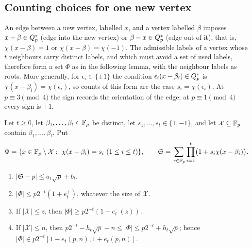 \subsection{Counting choices for one new vertex}\label{subsec:labellings:extension}

An edge between a new vertex, labelled $x$, and a vertex labelled $\beta$
imposes $x-\beta\in Q_{p}^{*}$ (edge into the new vertex) or $\beta-x\in Q_{p}^{*}$ (edge
out of it), that is, $\chi(x-\beta)=1$ or $\chi(x-\beta)=\chi(-1)$. The
admissible labels of a vertex whose $t$ neighbours carry distinct labels, and
which must avoid a set of used labels, therefore form a set $\Phi$ as in the
following lemma, with the neighbour labels as roots. More generally, for
$\epsilon_i\in\{\pm1\}$ the condition $\epsilon_i(x-\beta_i)\in Q_{p}^{*}$ is
$\chi(x-\beta_i)=\chi(\epsilon_i)$, so counts of this form are the case
$s_i=\chi(\epsilon_i)$. At $p\equiv3\pmod4$ the sign records the orientation of
the edge; at $p\equiv1\pmod4$ every sign is $+1$.

\begin{lemma}\label{lem:extension}
Let $t\ge0$, let $\beta_1,\dots,\beta_t\in\mathbb F_p$ be distinct, let
$s_1,\dots,s_t\in\{1,-1\}$, and let $\mathcal X\subseteq\mathbb F_p$ contain
$\beta_1,\dots,\beta_t$. Put
\[
 \Phi=\{x\in\Fp\setminus\mathcal X:\ \chi(x-\beta_i)=s_i\ (1\le i\le t)\},\qquad
 \mathfrak S=\sum_{x\in\Fp}\prod_{i=1}^t\bigl(1+s_i\chi(x-\beta_i)\bigr).
\]
\begin{enumerate}[label=\textup{(\alph*)}]
\item\label{it:ext:soft} $|\mathfrak S-p|\le a_t\sqrt p+b_t$.
\item\label{it:ext:upper} $|\Phi|\le p2^{-t}(1+e^+_t)$, whatever the size of
 $\mathcal X$.
\item\label{it:ext:lower} If $|\mathcal X|\le z$, then $|\Phi|\ge p2^{-t}(1-e^-_t(z))$.
\item\label{it:ext:coarse} If $|\mathcal X|\le n$, then
 $p2^{-t}-h_t\sqrt p-n\le|\Phi|\le p2^{-t}+h_t\sqrt p$; hence
 $|\Phi|\in p2^{-t}[1-e_t(p,n),1+e_t(p,n)]$.
\end{enumerate}
\end{lemma}

